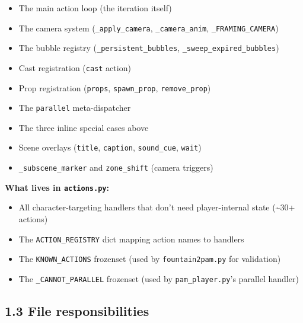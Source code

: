 \documentclass[
  11pt,
]{book}
\providecommand{\tightlist}{%
  \setlength{\itemsep}{0pt}\setlength{\parskip}{0pt}}
\begin{document}
\begin{itemize}
\tightlist
\item
  The main action loop (the iteration itself)
\item
  The camera system (\texttt{\_apply\_camera}, \texttt{\_camera\_anim},
  \texttt{\_FRAMING\_CAMERA})
\item
  The bubble registry (\texttt{\_persistent\_bubbles},
  \texttt{\_sweep\_expired\_bubbles})
\item
  Cast registration (\texttt{cast} action)
\item
  Prop registration (\texttt{props}, \texttt{spawn\_prop},
  \texttt{remove\_prop})
\item
  The \texttt{parallel} meta-dispatcher
\item
  The three inline special cases above
\item
  Scene overlays (\texttt{title}, \texttt{caption}, \texttt{sound\_cue},
  \texttt{wait})
\item
  \texttt{\_subscene\_marker} and \texttt{zone\_shift} (camera triggers)
\end{itemize}

\textbf{What lives in \texttt{actions.py}:}

\begin{itemize}
\tightlist
\item
  All character-targeting handlers that don't need player-internal state
  (\textasciitilde30+ actions)
\item
  The \texttt{ACTION\_REGISTRY} dict mapping action names to handlers
\item
  The \texttt{KNOWN\_ACTIONS} frozenset (used by
  \texttt{fountain2pam.py} for validation)
\item
  The \texttt{\_CANNOT\_PARALLEL} frozenset (used by
  \texttt{pam\_player.py}'s parallel handler)
\end{itemize}

\subsection{1.3 File responsibilities}\label{file-responsibilities}
\end{document}
